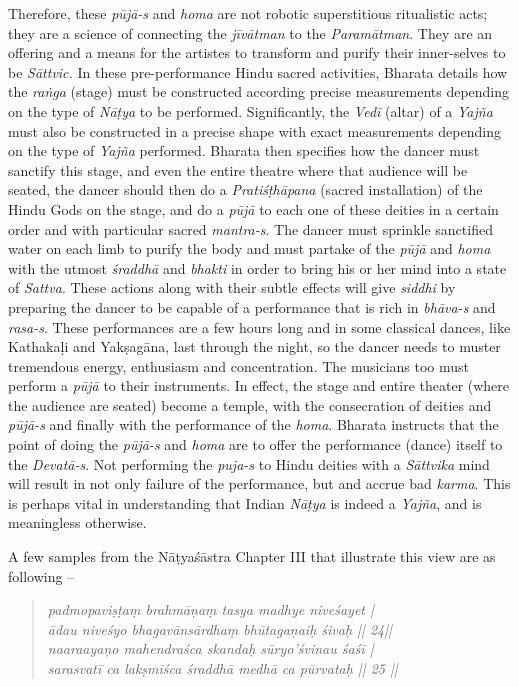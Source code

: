 Therefore, these \textit{pūjā-s} and \textit{homa} are not robotic superstitious ritualistic acts; they are a science of connecting the \textit{jīvātman} to the \textit{Paramātman}. They are an offering and a means for the artistes to transform and purify their inner-selves to be \textit{Sāttvic. }In these pre-performance Hindu sacred activities, Bharata details how the \textit{raṅga} (stage) must be constructed according precise measurements depending on the type of \textit{Nāṭya }to be performed. Significantly, the \textit{Vedī} (altar) of a \textit{Yajña} must also be constructed in a precise shape with exact measurements depending on the type of \textit{Yajña} performed. Bharata then specifies how the dancer must sanctify this stage, and even the entire theatre where that audience will be seated, the dancer should then do a \textit{Pratiśṭhāpana} (sacred installation) of the Hindu Gods on the stage, and do a \textit{pūjā }to each one of these deities in a certain order and with particular sacred \textit{mantra-s}. The dancer must sprinkle sanctified water on each limb to purify the body and must partake of the \textit{pūjā }and \textit{homa} with the utmost \textit{śraddhā} and \textit{bhakti }in order to bring his or her mind into a state of \textit{Sattva}. These actions along with their subtle effects will give \textit{siddhi} by preparing the dancer to be capable of a performance that is rich in \textit{bhāva-s} and \textit{rasa-s}. These performances are a few hours long and in some classical dances, like Kathakaḷi and Yakṣagāna, last through the night, so the dancer needs to muster tremendous energy, enthusiasm and concentration. The musicians too must perform a \textit{pūjā }to their instruments. In effect, the stage and entire theater (where the audience are seated) become a temple, with the consecration of deities and \textit{pūjā-s} and finally with the performance of the \textit{homa}. Bharata instructs that the point of doing the \textit{pūjā-s} and \textit{homa} are to offer the performance (dance) itself to the \textit{Devatā-s}. Not performing the \textit{puja-s} to Hindu deities with a \textit{Sāttvika} mind will result in not only failure of the performance, but and accrue bad \textit{karma}. This is perhaps vital in understanding that Indian \textit{Nāṭya} is indeed a \textit{Yajña}, and is meaningless otherwise.

A few samples from the Nāṭyaśāstra Chapter III that illustrate this view are as following –

\begin{verse}
\textit{padmopaviṣṭaṃ brahmāņaṃ tasya madhye niveśayet |}\\\textit{ādau niveśyo bhagavānsārdhaṃ bhūtagaņaiḥ śivaḥ || 24||}\\\textit{naaraayaņo mahendraśca skandaḥ sūryo’śvinau śaśī |}\\\textit{sarasvatī ca lakṣmīśca śraddhā medhā ca pūrvataḥ || 25 ||}
\end{verse}

